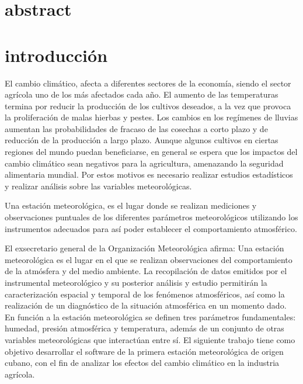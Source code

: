 \documentclass[12pt,letterpaper]{article}
\begin{document}
\begin{sloppypar}
        \section{abstract}

        \newpage
        \tableofcontents

        \newpage



        \section{introducción}\label{sec:introduccion}
        El cambio climático, afecta a diferentes sectores de la economía,
        siendo el
        sector agrícola uno de los más afectados cada año.
        El aumento de las temperaturas termina por reducir la producción de los
        cultivos deseados, a la vez que provoca la proliferación de malas
        hierbas y
        pestes.
        Los cambios en los regímenes de lluvias aumentan las probabilidades
        de fracaso
        de las cosechas a corto plazo y de reducción de la producción a largo
        plazo.
        Aunque algunos cultivos en ciertas regiones del mundo puedan
        beneficiarse, en
        general se espera que los impactos del cambio climático sean
        negativos para la
        agricultura, amenazando la seguridad alimentaria mundial.
        Por estos motivos es necesario realizar estudios estadísticos y realizar
        análisis sobre las variables meteorológicas.

        Una estación meteorológica, es el lugar donde se realizan mediciones y
        observaciones puntuales de los diferentes parámetros meteorológicos
        utilizando
        los instrumentos adecuados para así poder establecer el comportamiento
        atmosférico.

        El exsecretario general de la Organización Meteorológica afirma: Una
        estación
        meteorológica es el lugar en el que se realizan observaciones del
        comportamiento de la atmósfera y del medio ambiente.
        La recopilación de datos emitidos por el instrumental meteorológico y su
        posterior análisis y estudio permitirán la caracterización espacial y
        temporal
        de los fenómenos atmosféricos, así como la realización de un
        diagnóstico de la
        situación atmosférica en un momento dado.
        En función a la estación meteorológica se definen tres parámetros
        fundamentales: humedad, presión atmosférica y temperatura, además de un
        conjunto de otras variables meteorológicas que interactúan entre sí.
        El siguiente trabajo tiene como objetivo desarrollar el software de la
        primera estación meteorológica de origen cubano,
        con el fin de analizar los efectos del cambio climático en la
        industria agrícola.


\end{sloppypar}
\end{document}
